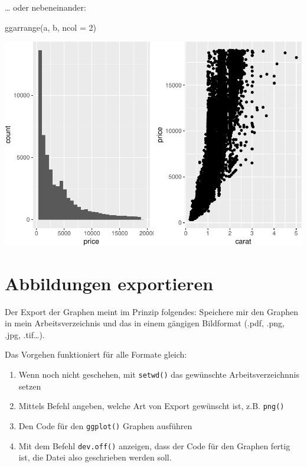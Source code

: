 \documentclass[
]{book}
\newenvironment{Shaded}{\begin{snugshade}}{\end{snugshade}}
\newcommand{\AttributeTok}[1]{\textcolor[rgb]{0.77,0.63,0.00}{#1}}
\newcommand{\DecValTok}[1]{\textcolor[rgb]{0.00,0.00,0.81}{#1}}
\newcommand{\FunctionTok}[1]{\textcolor[rgb]{0.00,0.00,0.00}{#1}}
\newcommand{\NormalTok}[1]{#1}
\begin{document}
\ldots{} oder nebeneinander:

\begin{Shaded}
\begin{Highlighting}[]
\FunctionTok{ggarrange}\NormalTok{(a, b, }\AttributeTok{ncol =} \DecValTok{2}\NormalTok{)}
\end{Highlighting}
\end{Shaded}

\includegraphics{CFH_R_bookdown_files/figure-latex/unnamed-chunk-188-1.pdf}

\hypertarget{abbildungen-exportieren}{%
\section{Abbildungen exportieren}\label{abbildungen-exportieren}}

Der Export der Graphen meint im Prinzip folgendes: Speichere mir den Graphen in mein Arbeitsverzeichnis und das in einem gängigen Bildformat (.pdf, .png, .jpg, .tif\ldots).

Das Vorgehen funktioniert für alle Formate gleich:

\begin{enumerate}
\def\labelenumi{\arabic{enumi}.}
\item
  Wenn noch nicht geschehen, mit \texttt{setwd()} das gewünschte Arbeitsverzeichnnis setzen
\item
  Mittels Befehl angeben, welche Art von Export gewünscht ist, z.B. \texttt{png()}
\item
  Den Code für den \texttt{ggplot()} Graphen ausführen
\item
  Mit dem Befehl \texttt{dev.off()} anzeigen, dass der Code für den Graphen fertig ist, die Datei also geschrieben werden soll.
\end{enumerate}
\end{document}
